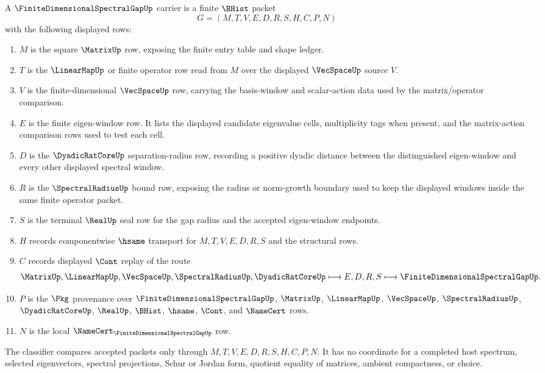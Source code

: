 \begin{definition}
\label{def:finite-dimensional-spectral-gap-namecert-carrier}
A $\FiniteDimensionalSpectralGapUp$ carrier is a finite $\BHist$ packet
$$
G=(M,T,V,E,D,R,S,H,C,P,N)
$$
with the following displayed rows:
\begin{enumerate}
\item $M$ is the square $\MatrixUp$ row, exposing the finite entry table and shape ledger.
\item $T$ is the $\LinearMapUp$ or finite operator row read from $M$ over the displayed $\VecSpaceUp$ source $V$.
\item $V$ is the finite-dimensional $\VecSpaceUp$ row, carrying the basis-window and scalar-action data used by the matrix/operator comparison.
\item $E$ is the finite eigen-window row. It lists the displayed candidate eigenvalue cells, multiplicity tags when present, and the matrix-action comparison rows used to test each cell.
\item $D$ is the $\DyadicRatCoreUp$ separation-radius row, recording a positive dyadic distance between the distinguished eigen-window and every other displayed spectral window.
\item $R$ is the $\SpectralRadiusUp$ bound row, exposing the radius or norm-growth boundary used to keep the displayed windows inside the same finite operator packet.
\item $S$ is the terminal $\RealUp$ seal row for the gap radius and the accepted eigen-window endpoints.
\item $H$ records componentwise $\hsame$ transport for $M,T,V,E,D,R,S$ and the structural rows.
\item $C$ records displayed $\Cont$ replay of the route
$$
\MatrixUp,\LinearMapUp,\VecSpaceUp,\SpectralRadiusUp,\DyadicRatCoreUp
\longmapsto E,D,R,S
\longmapsto \FiniteDimensionalSpectralGapUp .
$$
\item $P$ is the $\Pkg$ provenance over $\FiniteDimensionalSpectralGapUp$, $\MatrixUp$, $\LinearMapUp$, $\VecSpaceUp$, $\SpectralRadiusUp$, $\DyadicRatCoreUp$, $\RealUp$, $\BHist$, $\hsame$, $\Cont$, and $\NameCert$ rows.
\item $N$ is the local $\NameCert_{\FiniteDimensionalSpectralGapUp}$ row.
\end{enumerate}
The classifier compares accepted packets only through $M,T,V,E,D,R,S,H,C,P,N$. It has no coordinate for a completed host spectrum, selected eigenvectors, spectral projections, Schur or Jordan form, quotient equality of matrices, ambient compactness, or choice.
\end{definition}


